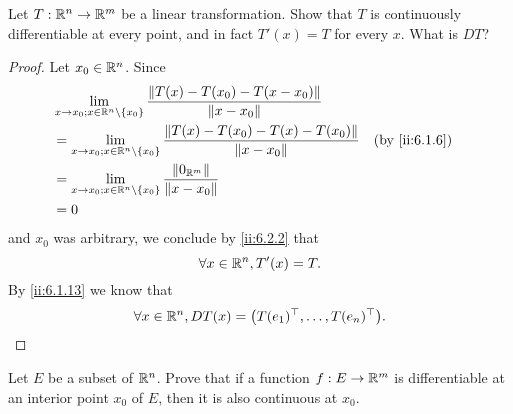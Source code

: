 \exercisesection

\begin{ex}\label{ii:ex:6.4.1}
  Let \(T : \mathbb{R}^n \to \mathbb{R}^m\) be a linear transformation.
  Show that \(T\) is continuously differentiable at every point, and in fact \(T'(x) = T\) for every \(x\).
  What is \(D T\)?
\end{ex}

\begin{proof}
  Let \(x_0 \in \mathbb{R}^n\).
  Since
  \begin{align*}
     & \lim_{x \to x_0 ; x \in \R^n \setminus \set{x_0}} \dfrac{\norm*{T(x) - T(x_0) - T(x - x_0)}}{\norm*{x - x_0}}                         \\
     & = \lim_{x \to x_0 ; x \in \R^n \setminus \set{x_0}} \dfrac{\norm*{T(x) - T(x_0) - T(x) - T(x_0)}}{\norm*{x - x_0}} &  & \by{ii:6.1.6} \\
     & = \lim_{x \to x_0 ; x \in \R^n \setminus \set{x_0}} \dfrac{\norm*{0_{\R^m}}}{\norm*{x - x_0}}                                         \\
     & = 0
  \end{align*}
  and \(x_0\) was arbitrary, we conclude by \cref{ii:6.2.2} that
  \[
    \forall x \in \mathbb{R}^n, T'(x) = T.
  \]
  By \cref{ii:6.1.13} we know that
  \[
    \forall x \in \mathbb{R}^n, D T(x) = \big(T(e_1)^\top, \dots, T(e_n)^\top\big).
  \]
\end{proof}

\begin{ex}\label{ii:ex:6.4.2}
  Let \(E\) be a subset of \(\mathbb{R}^n\).
  Prove that if a function \(f : E \to \mathbb{R}^m\) is differentiable at an interior point \(x_0\) of \(E\), then it is also continuous at \(x_0\).
\end{ex}

